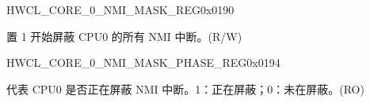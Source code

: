 \begin{register}{H}{WCL\_CORE\_0\_NMI\_MASK\_REG}{0x{}0190}\label{regdesc:WCLCORE0NMIMASKREG}
%
%
\regnewline%
\begin{regdesc}\begin{reglist}
\label{fielddesc:WCLCORE0NMIMASK}\item [WCL\_CORE\_0\_NMI\_MASK] 置 1 开始屏蔽 CPU0 的所有 NMI 中断。(R/W)
\end{reglist}\end{regdesc}
\end{register}


\begin{register}{H}{WCL\_CORE\_0\_NMI\_MASK\_PHASE\_REG}{0x{}0194}\label{regdesc:WCLCORE0NMIMASKPHASEREG}
%
%
\regnewline%
\begin{regdesc}\begin{reglist}
\label{fielddesc:WCLCORE0NMIMASKPHASE}\item [WCL\_CORE\_0\_NMI\_MASK\_PHASE] 代表 CPU0 是否正在屏蔽 NMI 中断。1：正在屏蔽；0：未在屏蔽。(RO)
\end{reglist}\end{regdesc}
\end{register}

















































